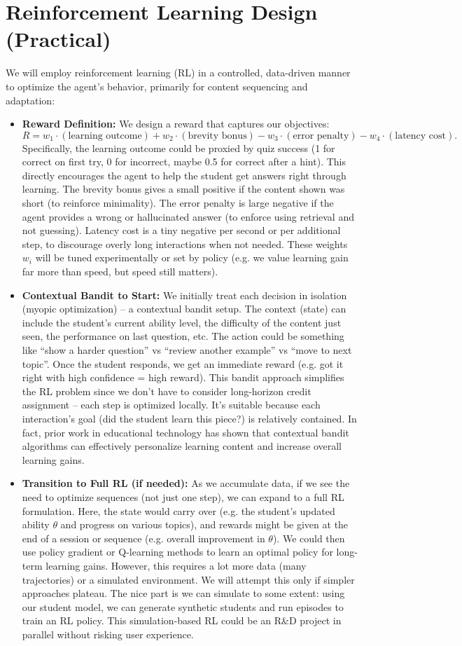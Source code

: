 \documentclass[11pt]{article}
\begin{document}
\section{Reinforcement Learning Design (Practical)}
We will employ reinforcement learning (RL) in a controlled, data-driven manner to optimize the agent’s behavior, primarily for content sequencing and adaptation:
\begin{itemize}
  \item \textbf{Reward Definition:} We design a reward that captures our objectives: 
    $$R = w_1 \cdot (\text{learning outcome}) + w_2 \cdot (\text{brevity bonus}) - w_3 \cdot (\text{error penalty}) - w_4 \cdot (\text{latency cost}).$$ 
    Specifically, the learning outcome could be proxied by quiz success (1 for correct on first try, 0 for incorrect, maybe 0.5 for correct after a hint). This directly encourages the agent to help the student get answers right through learning. The brevity bonus gives a small positive if the content shown was short (to reinforce minimality). The error penalty is large negative if the agent provides a wrong or hallucinated answer (to enforce using retrieval and not guessing). Latency cost is a tiny negative per second or per additional step, to discourage overly long interactions when not needed. These weights $w_i$ will be tuned experimentally or set by policy (e.g. we value learning gain far more than speed, but speed still matters).
  \item \textbf{Contextual Bandit to Start:} We initially treat each decision in isolation (myopic optimization) – a contextual bandit setup. The context (state) can include the student’s current ability level, the difficulty of the content just seen, the performance on last question, etc. The action could be something like “show a harder question” vs “review another example” vs “move to next topic”. Once the student responds, we get an immediate reward (e.g. got it right with high confidence = high reward). This bandit approach simplifies the RL problem since we don’t have to consider long-horizon credit assignment – each step is optimized locally. It’s suitable because each interaction’s goal (did the student learn this piece?) is relatively contained. In fact, prior work in educational technology has shown that contextual bandit algorithms can effectively personalize learning content and increase overall learning gains.
  \item \textbf{Transition to Full RL (if needed):} As we accumulate data, if we see the need to optimize sequences (not just one step), we can expand to a full RL formulation. Here, the state would carry over (e.g. the student’s updated ability $\theta$ and progress on various topics), and rewards might be given at the end of a session or sequence (e.g. overall improvement in $\theta$). We could then use policy gradient or Q-learning methods to learn an optimal policy for long-term learning gains. However, this requires a lot more data (many trajectories) or a simulated environment. We will attempt this only if simpler approaches plateau. The nice part is we can simulate to some extent: using our student model, we can generate synthetic students and run episodes to train an RL policy. This simulation-based RL could be an R\&D project in parallel without risking user experience.

\end{itemize}
\end{document}
